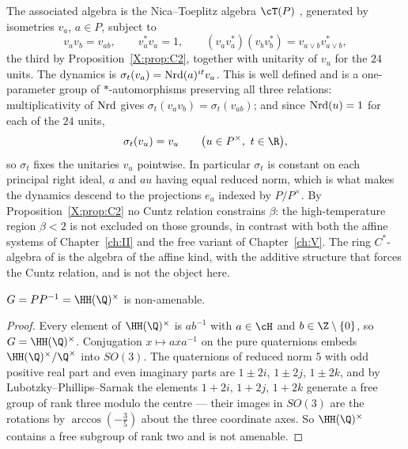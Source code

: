 \begin{remark}\label{X:rem:relations}
The associated algebra is the Nica--Toeplitz algebra $\cT(P)$ \cite{Nica,LacaRaeburn},
generated by isometries $v_a$, $a\in P$, subject to
\[
v_av_b=v_{ab},\qquad v_a^*v_a=1,\qquad (v_av_a^*)(v_bv_b^*)=v_{a\vee b}v_{a\vee b}^*,
\]
the third by Proposition~\ref{X:prop:C2}, together with unitarity of $v_u$ for the $24$ units.
The dynamics is $\sigma_t(v_a)=\operatorname{Nrd}(a)^{it}v_a$. This is well defined and is a one-parameter
group of $*$-automorphisms preserving all three relations: multiplicativity of $\operatorname{Nrd}$ gives
$\sigma_t(v_av_b)=\sigma_t(v_{ab})$; and since $\operatorname{Nrd}(u)=1$ for each of the $24$ units,
\[
\sigma_t(v_u)=v_u\qquad\bigl(u\in P^\times,\ t\in\R\bigr),
\]
so $\sigma_t$ fixes the unitaries $v_u$ pointwise. In particular $\sigma_t$ is constant on
each principal right ideal, $a$ and $au$ having equal reduced norm, which is what makes the
dynamics descend to the projections $e_a$ indexed by $P/P^\times$. By
Proposition~\ref{X:prop:C2} no Cuntz relation constrains $\beta$: the
high-temperature region $\beta<2$ is not excluded on those grounds, in contrast with both the
affine systems of Chapter~\ref{ch:II} and the free variant of Chapter~\ref{ch:V}. The ring $C^*$-algebra of
\cite{CL} is the algebra of the affine kind, with the additive structure that forces the
Cuntz relation, and is not the object here.
\end{remark}

\begin{proposition}\label{X:prop:nonamen}
$G=PP^{-1}=\HH(\Q)^\times$ is non-amenable.
\end{proposition}

\begin{proof}
Every element of $\HH(\Q)^\times$ is $ab^{-1}$ with $a\in\cH$ and $b\in\Z\setminus\{0\}$, so
$G=\HH(\Q)^\times$. Conjugation $x\mapsto axa^{-1}$ on the pure quaternions embeds
$\HH(\Q)^\times/\Q^\times$ into $SO(3)$. The quaternions of reduced norm $5$ with odd
positive real part and even imaginary parts are $1\pm2i$, $1\pm2j$, $1\pm2k$, and by
Lubotzky--Phillips--Sarnak \cite[\S3]{LPS} the elements $1+2i$, $1+2j$, $1+2k$ generate a
free group of rank three modulo the centre --- their images in $SO(3)$ are the rotations by
$\arccos(-\frac35)$ about the three coordinate axes. So $\HH(\Q)^\times$ contains a free
subgroup of rank two and is not amenable.
\end{proof}

